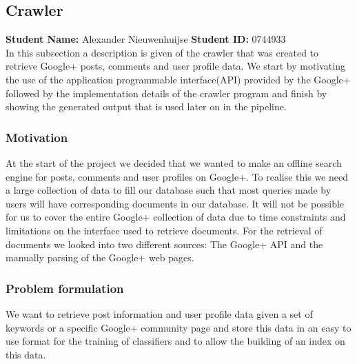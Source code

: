 \subsection{Crawler}
\textbf{Student Name: }Alexander Nieuwenhuijse \textbf{Student ID:} 0744933\\
In this subsection a description is given of the crawler that was created to retrieve Google+ posts, comments and user profile data. We start by motivating the use of the application programmable interface(API) provided by the Google+ followed by the implementation details of the crawler program and finish by showing the generated output that is used later on in the pipeline.
\subsubsection*{Motivation}
At the start of the project we decided that we wanted to make an offline search engine for posts, comments and user profiles on Google+. To realise this we need a large collection of data to fill our database such that most queries made by users will have corresponding documents in our database. It will not be possible for us to cover the entire Google+ collection of data due to time constraints and limitations on the interface used to retrieve documents. For the retrieval of documents we looked into two different sources: The Google+ API and the manually parsing of the Google+ web pages. 
\subsubsection*{Problem formulation}
We want to retrieve post information and user profile data given a set of keywords or a specific Google+ community page and store this data in an easy to use format for the training of classifiers and to allow the building of an index on this data.

